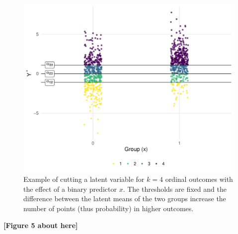 \documentclass[
  man, mask,floatsintext]{apa6}
\begin{document}
\normalsize

\scriptsize

\begin{figure}

{\centering \includegraphics[width=1\linewidth]{paper_files/figure-latex/fig-sim-from-latent-1} 

}

\caption{Example of cutting a latent variable for \(k = 4\) ordinal outcomes with the effect of a binary predictor \(x\). The thresholds are fixed and the difference between the latent means of the two groups increase the number of points (thus probability) in higher outcomes.}\label{fig:fig-sim-from-latent}
\end{figure}

\begin{center}\textbf{[Figure 5 about here]} \end{center}

\normalsize

\scriptsize
\end{document}
